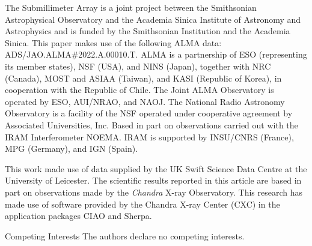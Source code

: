 \documentclass{nature_plusfigure}
\begin{document}
\begin{addendum}
The Submillimeter Array is a joint project between the Smithsonian Astrophysical Observatory and the Academia Sinica Institute of Astronomy and Astrophysics and is funded by the Smithsonian Institution and the Academia Sinica.
%
This paper makes use of the following ALMA data: ADS/JAO.ALMA\#2022.A.00010.T. ALMA is a partnership of ESO (representing its member states), NSF (USA), and NINS (Japan), together with NRC (Canada), MOST and ASIAA (Taiwan), and KASI (Republic of Korea), in cooperation with the Republic of Chile. The Joint ALMA Observatory is operated by ESO, AUI/NRAO, and NAOJ. The National Radio Astronomy Observatory is a facility of the NSF operated under cooperative agreement by Associated Universities, Inc.
%
Based in part on observations carried out with the IRAM Interferometer NOEMA. IRAM is supported by INSU/CNRS (France), MPG (Germany), and IGN (Spain).

This work made use of data supplied by the UK Swift Science Data Centre at the University of Leicester.
The scientific results reported in this article are based in part on observations made by the {\it Chandra} X-ray Observatory. This research has made use of software provided by the Chandra X-ray Center (CXC) in the application packages CIAO and Sherpa.

 \item[Competing Interests] The authors declare no competing interests.


\end{addendum}
\end{document}
